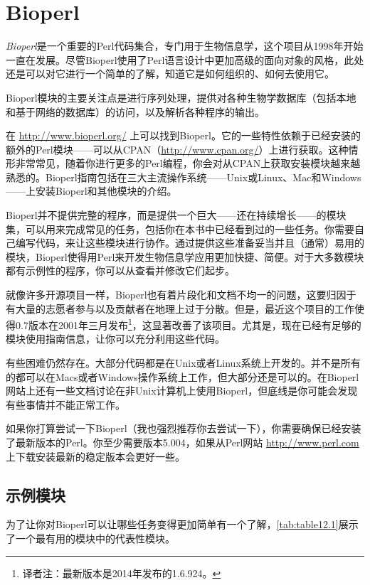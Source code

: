 \section{Bioperl}
\textit{Bioperl}是一个重要的Perl代码集合，专门用于生物信息学，这个项目从1998年开始一直在发展。尽管Bioperl使用了Perl语言设计中更加高级的面向对象的风格，此处还是可以对它进行一个简单的了解，知道它是如何组织的、如何去使用它。

Bioperl模块的主要关注点是进行序列处理，提供对各种生物学数据库（包括本地和基于网络的数据库）的访问，以及解析各种程序的输出。

在 \href{http://www.bioperl.org/}{http://www.bioperl.org/} 上可以找到Bioperl。它的一些特性依赖于已经安装的额外的Perl模块——可以从CPAN（\href{http://www.cpan.org/}{http://www.cpan.org/}）上进行获取。这种情形非常常见，随着你进行更多的Perl编程，你会对从CPAN上获取安装模块越来越熟悉的。Bioperl指南包括在三大主流操作系统——Unix或Linux、Mac和Windows——上安装Bioperl和其他模块的介绍。

Bioperl并不提供完整的程序，而是提供一个巨大——还在持续增长——的模块集，可以用来完成常见的任务，包括你在本书中已经看到过的一些任务。你需要自己编写代码，来让这些模块进行协作。通过提供这些准备妥当并且（通常）易用的模块，Bioperl使得用Perl来开发生物信息学应用更加快捷、简便。对于大多数模块都有示例性的程序，你可以从查看并修改它们起步。

就像许多开源项目一样，Bioperl也有着片段化和文档不均一的问题，这要归因于有大量的志愿者参与以及贡献者在地理上过于分散。但是，最近这个项目的工作使得0.7版本在2001年三月发布\footnote{译者注：最新版本是2014年发布的1.6.924。}，这显著改善了该项目。尤其是，现在已经有足够的模块使用指南信息，让你可以充分利用这些代码。

有些困难仍然存在。大部分代码都是在Unix或者Linux系统上开发的。并不是所有的都可以在Macs或者Windows操作系统上工作，但大部分还是可以的。在Bioperl网站上还有一些文档讨论在非Unix计算机上使用Bioperl，但底线是你可能会发现有些事情并不能正常工作。

如果你打算尝试一下Bioperl（我也强烈推荐你去尝试一下），你需要确保已经安装了最新版本的Perl。你至少需要版本5.004，如果从Perl网站 \href{http://www.perl.com}{http://www.perl.com} 上下载安装最新的稳定版本会更好一些。

\subsection{示例模块}
为了让你对Bioperl可以让哪些任务变得更加简单有一个了解，\autoref{tab:table12.1}展示了一个最有用的模块中的代表性模块。

